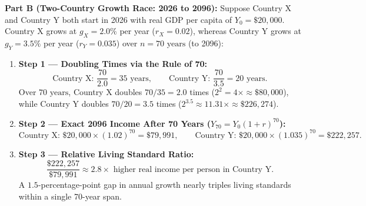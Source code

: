 \documentclass[11pt,letterpaper]{article}
\begin{document}
\noindent\textbf{Part B (Two-Country Growth Race: 2026 to 2096):} Suppose Country X and Country Y both start in 2026 with real GDP per capita of $Y_0 = \$20,000$. Country X grows at $g_X = 2.0\%$ per year ($r_X = 0.02$), whereas Country Y grows at $g_Y = 3.5\%$ per year ($r_Y = 0.035$) over $n = 70\text{ years}$ (to 2096):
\begin{enumerate}
  \item \textbf{Step 1 — Doubling Times via the Rule of 70:}
  $$\text{Country X: } \frac{70}{2.0} = 35\text{ years}, \qquad \text{Country Y: } \frac{70}{3.5} = 20\text{ years}.$$
  Over $70\text{ years}$, Country X doubles $70 / 35 = 2.0$ times ($2^2 = 4\times \approx \$80,000$), while Country Y doubles $70 / 20 = 3.5$ times ($2^{3.5} \approx 11.31\times \approx \$226,274$).
  \item \textbf{Step 2 — Exact 2096 Income After 70 Years ($Y_{70} = Y_0(1+r)^{70}$):}
  $$\text{Country X: } \$20,000 \times (1.02)^{70} = \$79,991, \qquad \text{Country Y: } \$20,000 \times (1.035)^{70} = \$222,257.$$
  \item \textbf{Step 3 — Relative Living Standard Ratio:}
  $$\frac{\$222,257}{\$79,991} \approx 2.8\times \text{ higher real income per person in Country Y}.$$
  A $1.5$-percentage-point gap in annual growth nearly triples living standards within a single 70-year span.
\end{enumerate}
\end{document}
